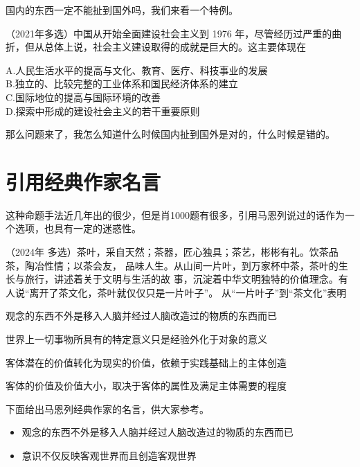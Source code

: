 \documentclass[lang=cn,blue,10pt,scheme=chinese,twocol]{zznote}
\begin{document}
\begin{note}
	国内的东西一定不能扯到国外吗，我们来看一个特例。

\end{note}
\begin{lemma}

	（2021年多选）中国从开始全面建设社会主义到 1976 年，尽管经历过严重的曲折，但从总体上说，社会主义建设取得的成就是巨大的。这主要体现在

	A.\;\;人民生活水平的提高与文化、教育、医疗、科技事业的发展\\
	B.\;\;独立的、比较完整的工业体系和国民经济体系的建立\\
	C.\;\;国际地位的提高与国际环境的改善\\
	D.\;\;探索中形成的建设社会主义的若干重要原则
\end{lemma}
那么问题来了，我怎么知道什么时候国内扯到国外是对的，什么时候是错的。



\section{引用经典作家名言}
\begin{definition}
	这种命题手法近几年出的很少，但是肖1000题有很多，引用马恩列说过的话作为一个选项，也具有一定的迷惑性。
\end{definition}



\begin{example} （2024年 多选）茶叶，采自天然；茶器，匠心独具；茶艺，彬彬有礼。饮茶品茶，陶冶性情；以茶会友， 品味人生。从山间一片叶，到万家杯中茶，茶叶的生长与旅行，讲述着关于文明与生活的故 事，沉淀着中华文明独特的价值理念。有人说“离开了茶文化，茶叶就仅仅只是一片叶子”。 从“一片叶子”到“茶文化”表明
	\begin{choice}
		\item 观念的东西不外是移入人脑并经过人脑改造过的物质的东西而已
		\item 世界上一切事物所具有的特定意义只是经验外化于对象的意义
		\item 客体潜在的价值转化为现实的价值，依赖于实践基础上的主体创造
		\item 客体的价值及价值大小，取决于客体的属性及满足主体需要的程度
	\end{choice}
\end{example}


\begin{assumption}
	下面给出马恩列经典作家的名言，供大家参考。
	\begin{itemize}
		\item 观念的东西不外是移入人脑并经过人脑改造过的物质的东西而已
		\item 意识不仅反映客观世界而且创造客观世界
	\end{itemize}
\end{assumption}
\end{document}
